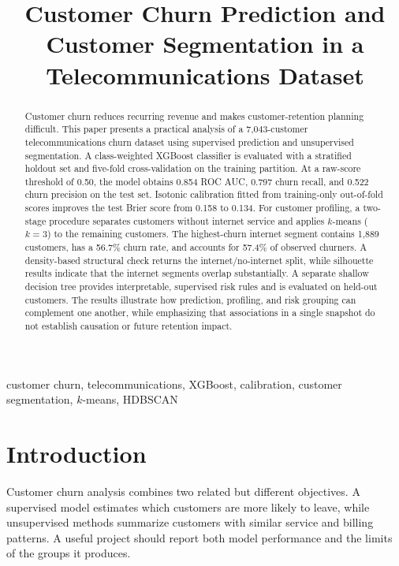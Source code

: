 \documentclass[conference]{IEEEtran}
\begin{document}
\title{Customer Churn Prediction and Customer Segmentation in a Telecommunications Dataset}

\author{
}

\maketitle

\begin{abstract}
Customer churn reduces recurring revenue and makes customer-retention planning difficult. This paper presents a practical analysis of a 7,043-customer telecommunications churn dataset using supervised prediction and unsupervised segmentation. A class-weighted XGBoost classifier is evaluated with a stratified holdout set and five-fold cross-validation on the training partition. At a raw-score threshold of 0.50, the model obtains 0.854 ROC AUC, 0.797 churn recall, and 0.522 churn precision on the test set. Isotonic calibration fitted from training-only out-of-fold scores improves the test Brier score from 0.158 to 0.134. For customer profiling, a two-stage procedure separates customers without internet service and applies $k$-means ($k=3$) to the remaining customers. The highest-churn internet segment contains 1,889 customers, has a 56.7\% churn rate, and accounts for 57.4\% of observed churners. A density-based structural check returns the internet/no-internet split, while silhouette results indicate that the internet segments overlap substantially. A separate shallow decision tree provides interpretable, supervised risk rules and is evaluated on held-out customers. The results illustrate how prediction, profiling, and risk grouping can complement one another, while emphasizing that associations in a single snapshot do not establish causation or future retention impact.
\end{abstract}

\begin{IEEEkeywords}
customer churn, telecommunications, XGBoost, calibration, customer segmentation, $k$-means, HDBSCAN
\end{IEEEkeywords}

\section{Introduction}
Customer churn analysis combines two related but different objectives. A supervised model estimates which customers are more likely to leave, while unsupervised methods summarize customers with similar service and billing patterns. A useful project should report both model performance and the limits of the groups it produces.
\end{document}
